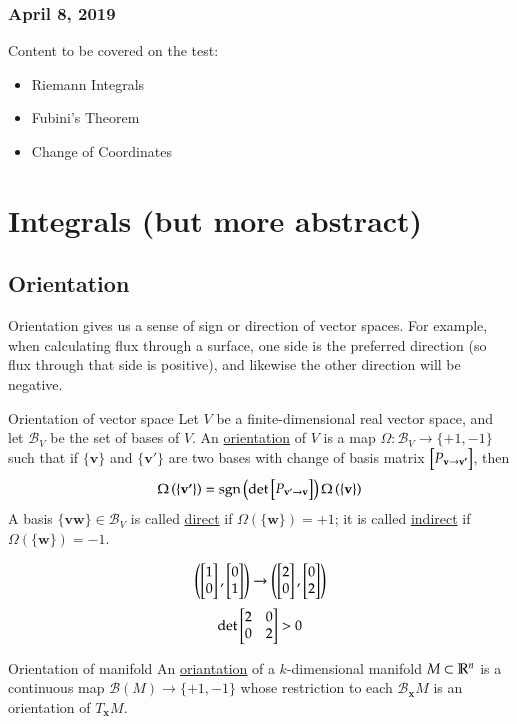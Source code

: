 \subsubsection*{April 8, 2019}

Content to be covered on the test: 
\begin{itemize}
	\item Riemann Integrals
	\item Fubini's Theorem
	\item Change of Coordinates
\end{itemize}

\section{Integrals (but more abstract)}
\subsection{Orientation}
Orientation gives us a sense of sign or direction of vector spaces. For example, when calculating flux through a surface, one side is the preferred direction (so flux through that side is positive), and likewise the other direction will be negative. 
\begin{defn}{Orientation of vector space}
	Let $V$ be a finite-dimensional real vector space, and let $\mathcal{B}_V$ be the set of bases of $V$. An \ul{orientation} of $V$ is a map $\Omega : \mathcal{B}_V \to \{+1, -1\}$ such that if $\{\bm{v}\}$ and $\{\bm{v'}\}$ are two bases with change of basis matrix $\begin{bmatrix} P_{\textbf{v}\to \textbf{v'}} \end{bmatrix}$, then
	\begin{equation}
		\Omega\left(\{\textbf{v'}\}\right) = \mathrm{sgn}\left( \mathrm{det} \begin{bmatrix} P_{\textbf{v'}\to \textbf{v}} \end{bmatrix} \right)\Omega\left(\{\textbf{v}\}\right)
	\end{equation}
	A basis $\{\bm{vw}\}\in\mathcal{B}_V$ is called \ul{direct} if $\Omega\left(\{\bm{w}\}\right)=+1$; it is called \ul{indirect} if $\Omega\left(\{\bm{w}\}\right)=-1$. 
\end{defn}

\example 
\[\left( \begin{bmatrix} 1\\0 \end{bmatrix}, \begin{bmatrix} 0\\1 \end{bmatrix} \right)\to \left( \begin{bmatrix} 2\\0 \end{bmatrix}, \begin{bmatrix} 0\\2 \end{bmatrix} \right)\]
\[\mathrm{det} \begin{bmatrix} 2 & 0 \\ 0 & 2 \end{bmatrix} > 0\]

\begin{defn}{Orientation of manifold}
	An \ul{oriantation} of a $k$-dimensional manifold $M\subset \mathbb{R}^n$ is a continuous map $\mathcal{B}(M)\to \{+1,-1\}$ whose restriction to each $\mathcal{B}_{\bm{x}}M$ is an orientation of $T_{\bm{x}}M$. 
\end{defn}

